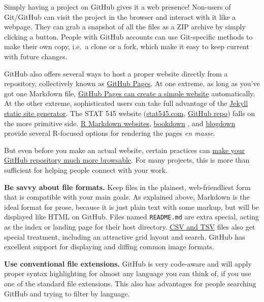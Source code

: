 \documentclass[12pt]{article}
\begin{document}
Simply having a project on GitHub gives it a web presence! Non-users of
Git/GitHub can visit the project in the browser and interact with it
like a webpage. They can grab a snapshot of all the files as a ZIP
archive by simply clicking a button. People with GitHub accounts can use
Git-specific methods to make their own copy, i.e.~a clone or a fork,
which make it easy to keep current with future changes.

GitHub also offers several ways to host a proper website directly from a
repository, collectively known as
\href{https://help.github.com/categories/github-pages-basics/}{GitHub
Pages}. At one extreme, as long as you've got one Markdown file,
\href{https://github.com/blog/2289-publishing-with-github-pages-now-as-easy-as-1-2-3}{GitHub
Pages can create a simple website} automatically. At the other extreme,
sophisticated users can take full advantage of the
\href{https://jekyllrb.com}{Jekyll static site generator}. The STAT 545
website (\href{http://stat545.com}{stat545.com},
\href{https://github.com/STAT545-UBC/STAT545-UBC.github.io}{GitHub
repo}) falls on the more primitive side.
\href{http://rmarkdown.rstudio.com/rmarkdown_websites.html}{R Markdown
websites}, \href{https://bookdown.org}{bookdown}
\citep{bookdown-pkg, bookdown-book}, and
\href{https://bookdown.org/yihui/blogdown/}{blogdown} provide several
R-focused options for rendering the pages \emph{en masse}.

But even before you make an actual website, certain practices can
\href{http://happygitwithr.com/repo-browsability.html}{make your GitHub
repository much more browsable}. For many projects, this is more than
sufficient for helping people connect with your work.

\textbf{Be savvy about file formats.} Keep files in the plainest,
web-friendliest form that is compatible with your main goals. As
explained above, Markdown is the ideal format for prose, because it is
just plain text with some markup, but will be displayed like HTML on
GitHub. Files named \texttt{README.md} are extra special, acting as the
index or landing page for their host directory.
\href{https://help.github.com/articles/rendering-csv-and-tsv-data/}{CSV
and TSV} files also get special treatment, including an attractive grid
layout and search. GitHub has excellent support for displaying and
diffing common image formats.

\textbf{Use conventional file extensions.} GitHub is very code-aware and
will apply proper syntax highlighting for almost any language you can
think of, if you use one of the standard file extensions. This also has
advantages for people searching GitHub and trying to filter by language.
\end{document}
